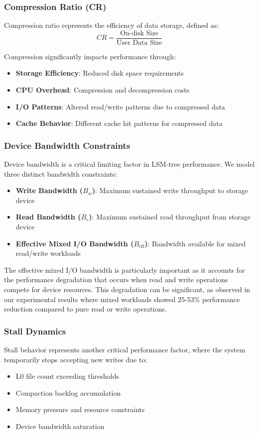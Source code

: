\documentclass[11pt]{article}
\begin{document}
\subsubsection{Compression Ratio (CR)}
Compression ratio represents the efficiency of data storage, defined as:
\begin{equation}
CR = \frac{\text{On-disk Size}}{\text{User Data Size}}
\end{equation}

Compression significantly impacts performance through:
\begin{itemize}
    \item \textbf{Storage Efficiency}: Reduced disk space requirements
    \item \textbf{CPU Overhead}: Compression and decompression costs
    \item \textbf{I/O Patterns}: Altered read/write patterns due to compressed data
    \item \textbf{Cache Behavior}: Different cache hit patterns for compressed data
\end{itemize}

\subsubsection{Device Bandwidth Constraints}
Device bandwidth is a critical limiting factor in LSM-tree performance. We model three distinct bandwidth constraints:

\begin{itemize}
    \item \textbf{Write Bandwidth ($B_w$)}: Maximum sustained write throughput to storage device
    \item \textbf{Read Bandwidth ($B_r$)}: Maximum sustained read throughput from storage device
    \item \textbf{Effective Mixed I/O Bandwidth ($B_{\text{eff}}$)}: Bandwidth available for mixed read/write workloads
\end{itemize}

The effective mixed I/O bandwidth is particularly important as it accounts for the performance degradation that occurs when read and write operations compete for device resources. This degradation can be significant, as observed in our experimental results where mixed workloads showed 25-53\% performance reduction compared to pure read or write operations.

\subsubsection{Stall Dynamics}
Stall behavior represents another critical performance factor, where the system temporarily stops accepting new writes due to:
\begin{itemize}
    \item L0 file count exceeding thresholds
    \item Compaction backlog accumulation
    \item Memory pressure and resource constraints
    \item Device bandwidth saturation
\end{itemize}
\end{document}

